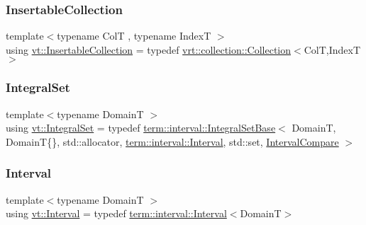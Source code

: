 \mbox{\label{namespacevt_a3fe0bbd9abf8f98d69d9f73c9f89e0a5}} 
\subsubsection{\texorpdfstring{Insertable\+Collection}{InsertableCollection}}
{\footnotesize\ttfamily template$<$typename ColT , typename IndexT $>$ \\
using \hyperlink{namespacevt_a3fe0bbd9abf8f98d69d9f73c9f89e0a5}{vt\+::\+Insertable\+Collection} = typedef \hyperlink{structvt_1_1vrt_1_1collection_1_1_collection}{vrt\+::collection\+::\+Collection}$<$ColT,IndexT$>$}

\mbox{\label{namespacevt_af8fc7210a3d8e598330cf3375857ef1e}} 
\subsubsection{\texorpdfstring{Integral\+Set}{IntegralSet}}
{\footnotesize\ttfamily template$<$typename DomainT $>$ \\
using \hyperlink{namespacevt_af8fc7210a3d8e598330cf3375857ef1e}{vt\+::\+Integral\+Set} = typedef \hyperlink{structvt_1_1term_1_1interval_1_1_integral_set_base}{term\+::interval\+::\+Integral\+Set\+Base}$<$ DomainT, DomainT\{\}, std\+::allocator, \hyperlink{structvt_1_1term_1_1interval_1_1_interval}{term\+::interval\+::\+Interval}, std\+::set, \hyperlink{namespacevt_ab51b754f1d22841f555246195fab9d41}{Interval\+Compare} $>$}

\mbox{\label{namespacevt_a0036b5cb523aef3477d6d5de9d94eabb}} 
\subsubsection{\texorpdfstring{Interval}{Interval}}
{\footnotesize\ttfamily template$<$typename DomainT $>$ \\
using \hyperlink{namespacevt_a0036b5cb523aef3477d6d5de9d94eabb}{vt\+::\+Interval} = typedef \hyperlink{structvt_1_1term_1_1interval_1_1_interval}{term\+::interval\+::\+Interval}$<$DomainT$>$}

\mbox{\label{namespacevt_ab51b754f1d22841f555246195fab9d41}} 

